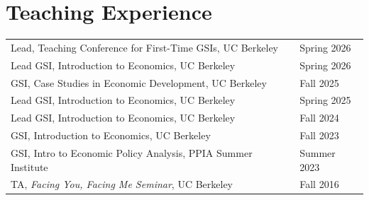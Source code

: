 \section{\sc Teaching Experience}
\begin{tabular}{@{}p{4.25in}p{2in}}
Lead, Teaching Conference for First-Time GSIs, UC Berkeley & Spring 2026 \\
Lead GSI, Introduction to Economics, UC Berkeley & Spring 2026 \\
GSI, Case Studies in Economic Development, UC Berkeley & Fall 2025 \\
Lead GSI, Introduction to Economics, UC Berkeley & Spring 2025 \\
Lead GSI, Introduction to Economics, UC Berkeley & Fall 2024 \\
GSI, Introduction to Economics, UC Berkeley & Fall 2023 \\
GSI, Intro to Economic Policy Analysis, PPIA Summer Institute & Summer 2023 \\
TA, \textit{Facing You, Facing Me Seminar}, UC Berkeley & Fall 2016



\end{tabular}
